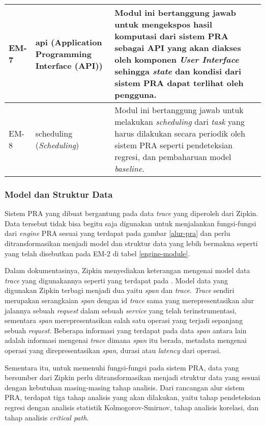\begin{small}
\begin{longtable}{ | p{1cm} | p{3cm} | p{10cm} | }
		EM-7 & api (Application Programming Interface (API)) & Modul ini bertanggung jawab untuk mengekspos hasil komputasi dari sistem PRA sebagai API yang akan diakses oleh komponen \textit{User Interface} sehingga \textit{state} dan kondisi dari sistem PRA dapat terlihat oleh pengguna. \\ \hline
		EM-8 & scheduling (\textit{Scheduling}) & Modul ini bertanggung jawab untuk melakukan \textit{scheduling} dari \textit{task} yang harus dilakukan secara periodik oleh sistem PRA seperti pendeteksian regresi, dan pembaharuan model \textit{baseline}. \\ \hline
	\end{longtable}
\end{small}

\subsubsection{Model dan Struktur Data}
Sistem PRA yang dibuat bergantung pada data \textit{trace} yang diperoleh dari Zipkin. Data tersebut tidak bisa begitu saja digunakan untuk menjalankan fungsi-fungsi dari \textit{engine} PRA sesuai yang terdapat pada gambar \ref{alur-pra} dan perlu ditransformasikan menjadi model dan struktur data yang lebih bermakna seperti yang telah disebutkan pada EM-2 di tabel \ref{engine-module}.

Dalam dokumentasinya, Zipkin menyediakan keterangan mengenai model data \textit{trace} yang digunakannya seperti yang terdapat pada \citep{zipkin-data}. Model data yang digunakan Zipkin terbagi menjadi dua yaitu \textit{span} dan \textit{trace}. \textit{Trace} sendiri merupakan serangkaian \textit{span} dengan id \textit{trace} sama yang merepresentasikan alur jalannya sebuah \textit{request} dalam sebuah \textit{service} yang telah terinstrumentasi, sementara \textit{span} merepresentasikan salah satu operasi yang terjadi sepanjang sebuah \textit{request}. Beberapa informasi yang terdapat pada data \textit{span} antara lain adalah informasi mengenai \textit{trace} dimana \textit{span} itu berada, metadata mengenai operasi yang direpresentasikan \textit{span}, durasi atau \textit{latency} dari operasi.

Sementara itu, untuk memenuhi fungsi-fungsi pada sistem PRA, data yang bersumber dari Zipkin perlu ditransformasikan menjadi struktur data yang sesuai dengan kebutuhan masing-masing tahap analisis. Dari rancangan alur sistem PRA, terdapat tiga tahap analisis yang akan dilakukan, yaitu tahap pendeteksian regresi dengan analisis statistik Kolmogorov-Smirnov, tahap analisis korelasi, dan tahap analisis \textit{critical path}.


